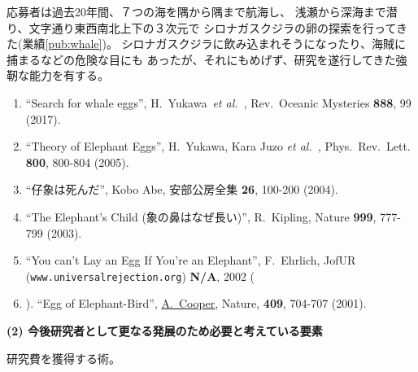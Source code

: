 \documentclass[11pt,a4j,dvipdfmx]{jarticle} 					%
\newcommand{\研究課題名}{象の卵}
\newcommand{\研究機関名}{逢坂大学}
\newcommand{\研究代表者氏名}{湯川秀樹}
\newcommand{\paper}[6]{%
	\item ``#1'', #2, #3 {\bf #4}, #5 (#6).			%
}
\newcommand{\etal}{\textit{et al.\ }}
\newcommand{\yukawa}{H.~Yukawa}					%
\newcommand{\prl}{Phys.\ Rev.\ Lett.\ }		%
\begin{document}
	応募者は過去20年間、７つの海を隅から隅まで航海し、
	浅瀬から深海まで潜り、文字通り東西南北上下の３次元で
	シロナガスクジラの卵の探索を行ってきた(業績\ref{pub:whale})。
	シロナガスクジラに飲み込まれそうになったり、海賊に捕まるなどの危険な目にも
	あったが、それにもめげず、研究を遂行してきた強靭な能力を有する。
	\begin{enumerate}
		\paper{Search for whale eggs}{\yukawa\ \etal}{Rev.\ Oceanic Mysteries}{888}{99}{2017}
			\label{pub:whale}
				
		\paper{Theory of Elephant Eggs}{\yukawa, Kara Juzo \etal}{\prl}{800}{800-804}{2005}
			\label{pub:theoegg}
				
		\paper{仔象は死んだ}{Kobo Abe}{安部公房全集}{26}{100-200}{2004}
		
		\paper{The Elephant's Child (象の鼻はなぜ長い)}{R.~Kipling}{Nature}{999}{777-799}{2003}

		\paper{You can't Lay an Egg If You're an Elephant}{F.~Ehrlich}
			{JofUR\\({\tt www.universalrejection.org})}{{\bf N/A}}{2002}
		
		\item ``Egg of Elephant-Bird'', 
				\underline{A.~Cooper},
				Nature, {\bf 409}, 704-707 (2001).	%
	\end{enumerate}
\vspace{5mm}
\noindent
\textbf{(2) 今後研究者として更なる発展のため必要と考えている要素}

研究費を獲得する術。




\end{document}
